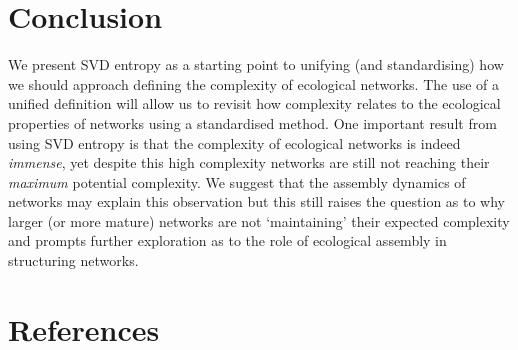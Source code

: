 \documentclass[11pt]{article}
\begin{document}
\hypertarget{conclusion}{%
\section{Conclusion}\label{conclusion}}

We present SVD entropy as a starting point to unifying (and
standardising) how we should approach defining the complexity of
ecological networks. The use of a unified definition will allow us to
revisit how complexity relates to the ecological properties of networks
using a standardised method. One important result from using SVD entropy
is that the complexity of ecological networks is indeed \emph{immense},
yet despite this high complexity networks are still not reaching their
\emph{maximum} potential complexity. We suggest that the assembly
dynamics of networks may explain this observation but this still raises
the question as to why larger (or more mature) networks are not
`maintaining' their expected complexity and prompts further exploration
as to the role of ecological assembly in structuring networks.

\hypertarget{references}{%
\section*{References}\label{references}}
\end{document}
